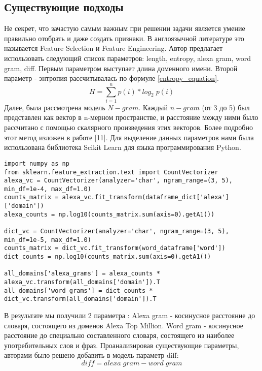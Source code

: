     \subsection{Существующие подходы}\label{be_class_exp}
    Не секрет, что зачастую самым важным при решении задачи является умение правильно отобрать и даже создать признаки. В англоязычной литературе это называется Feature Selection и Feature Engineering. Автор предлагает использовать следующий список параметров: length, entropy, alexa gram, word gram, diff.
    Первым параметром выступает длина доменного имени.
    Второй параметр - энтропия рассчитывалась по формуле \ref{entropy_equation}.
    \begin{equation}\label{entropy_equation}
    H = \sum_{i=1}^{n} p(i)*log_{2}\;p(i{})
    \end{equation}
    Далее, была рассмотрена модель $N-gram$. Каждый $n-gram$ (от 3 до 5) был представлен как вектор в n-мерном пространстве, и расстояние между ними было рассчитано с помощью скалярного произведения этих векторов. Более подробно этот метод изложен в работе [11].
    Для выделение данных параметров нами была использована библиотека Scikit Learn для языка программирования Python.
    \begin{lstlisting}
import numpy as np
from sklearn.feature_extraction.text import CountVectorizer
alexa_vc = CountVectorizer(analyzer='char', ngram_range=(3, 5), min_df=1e-4, max_df=1.0)
counts_matrix = alexa_vc.fit_transform(dataframe_dict['alexa']['domain'])
alexa_counts = np.log10(counts_matrix.sum(axis=0).getA1())

dict_vc = CountVectorizer(analyzer='char', ngram_range=(3, 5), min_df=1e-5, max_df=1.0)
counts_matrix = dict_vc.fit_transform(word_dataframe['word'])
dict_counts = np.log10(counts_matrix.sum(axis=0).getA1())

all_domains['alexa_grams'] = alexa_counts * alexa_vc.transform(all_domains['domain']).T
all_domains['word_grams'] = dict_counts * dict_vc.transform(all_domains['domain']).T
    \end{lstlisting}
    В результате мы получили 2 параметра :
    Alexa gram - косинусное расстояние до словаря, состоящего из доменов Alexa Top Million.
    Word gram - косинусное расстояние до специально составленного словаря, состоящего из наиболее употребительных слов и фраз.
    Проанализировав существующие параметры, авторами было решено добавить в модель параметр diff:
    \begin{equation}
    diff = alexa\;gram-word\;gram
    \end{equation}
